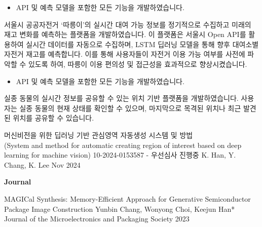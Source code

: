 \documentclass[10pt, a4paper]{cvhari}
\begin{document}
    {
        \begin{itemize}
            \item API 및 예측 모델을 포함한 모든 기능을 개발하였습니다.
        \end{itemize}
        서울시 공공자전거 ‘따릉이’의 실시간 대여 가능 정보를 정기적으로 수집하고 미래의 재고 변화를 예측하는 플랫폼을 개발하였습니다. 이 플랫폼은 서울시 Open API를 활용하여 실시간 데이터를 자동으로 수집하며, LSTM 딥러닝 모델을 통해 향후 대여소별 자전거 재고를 예측합니다. 이를 통해 사용자들이 자전거 이용 가능 여부를 사전에 파악할 수 있도록 하여, 따릉이 이용 편의성 및 접근성을 효과적으로 향상시켰습니다.

    }\par

    \smallskip 
    \divider
    \smallskip

    {
        \begin{itemize}
            \item API 및 예측 모델을 포함한 모든 기능을 개발하였습니다.
        \end{itemize}
        실종 동물의 실시간 정보를 공유할 수 있는 위치 기반 플랫폼을 개발하였습니다. 사용자는 실종 동물의 현재 상태를 확인할 수 있으며, 마지막으로 목격된 위치나 최근 발견된 위치를 공유할 수 있습니다.
    }
    \medskip

\medskip

\begin{itemize}
  \patententry
    {머신비전을 위한 딥러닝 기반 관심영역 자동생성 시스템 및 방법\\ \small (System and method for automatic creating region of interest based on deep learning for machine vision)\smallskip}
    {10-2024-0153587 - 우선심사 진행중}
    {K. Han, Y. Chang, K. Lee}
    {Nov 2024}
\end{itemize}

\bigskip

\textbf{Journal}\\
\begin{itemize}
  \journalentry
    {MAGICal Synthesis: Memory-Efficient Approach for Generative Semiconductor Package Image Construction}
    {Yunbin Chang, Wonyong Choi, Keejun Han*}
    {Journal of the Microelectronics and Packaging Society}
    {2023}
    \par
    \smallskip 
    \dividergray
    \smallskip
\end{itemize}
\end{document}
